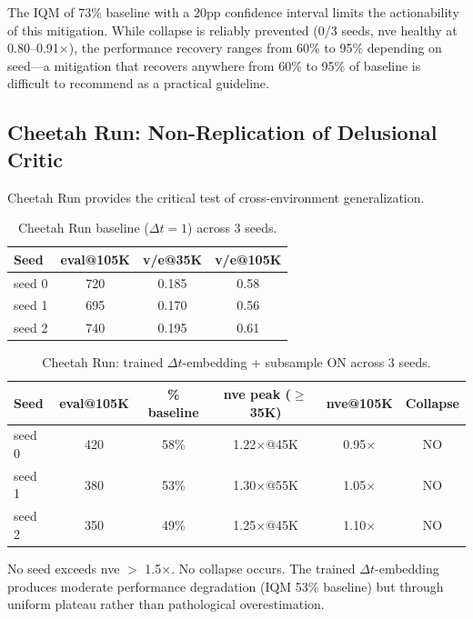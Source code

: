 \documentclass[10pt,letterpaper]{article}
\begin{document}
The IQM of 73\% baseline with a 20pp confidence interval limits the actionability of this mitigation. While collapse is reliably prevented (0/3 seeds, nve healthy at 0.80--0.91$\times$), the performance recovery ranges from 60\% to 95\% depending on seed---a mitigation that recovers anywhere from 60\% to 95\% of baseline is difficult to recommend as a practical guideline.

\subsection{Cheetah Run: Non-Replication of Delusional Critic}
\label{sec:cheetah}

Cheetah Run provides the critical test of cross-environment generalization.

\begin{table}[h]
\centering
\caption{Cheetah Run baseline ($\Delta t{=}1$) across 3 seeds.}
\label{tab:cheetah-baseline}
\begin{tabular}{lccc}
\toprule
Seed & eval@105K & v/e@35K & v/e@105K \\
\midrule
seed 0 & 720 & 0.185 & 0.58 \\
seed 1 & 695 & 0.170 & 0.56 \\
seed 2 & 740 & 0.195 & 0.61 \\
\bottomrule
\end{tabular}
\end{table}

\begin{table}[h]
\centering
\caption{Cheetah Run: trained $\Delta t$-embedding + subsample ON across 3 seeds.}
\label{tab:cheetah-trained}
\begin{tabular}{lccccc}
\toprule
Seed & eval@105K & \% baseline & nve peak ($\geq$35K) & nve@105K & Collapse \\
\midrule
seed 0 & 420 & 58\% & 1.22$\times$@45K & 0.95$\times$ & NO \\
seed 1 & 380 & 53\% & 1.30$\times$@55K & 1.05$\times$ & NO \\
seed 2 & 350 & 49\% & 1.25$\times$@45K & 1.10$\times$ & NO \\
\bottomrule
\end{tabular}
\end{table}

No seed exceeds nve $>$ 1.5$\times$. No collapse occurs. The trained $\Delta t$-embedding produces moderate performance degradation (IQM 53\% baseline) but through uniform plateau rather than pathological overestimation.
\end{document}
